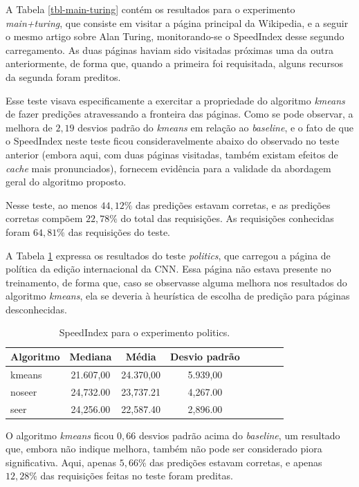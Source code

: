 \documentclass[10pt,twocolumn,letterpaper]{article}
\begin{document}
A Tabela \ref{tbl-main-turing} contém os resultados para o experimento \emph{main+turing}, que consiste em visitar a página principal da Wikipedia, e a seguir o mesmo artigo sobre Alan Turing, monitorando-se o SpeedIndex desse segundo carregamento. As duas páginas haviam sido visitadas próximas uma da outra anteriormente, de forma que, quando a primeira foi requisitada, alguns recursos da segunda foram preditos.

Esse teste visava especificamente a exercitar a propriedade do algoritmo \emph{kmeans} de fazer predições atravessando a fronteira das páginas. Como se pode observar,  a melhora de $2,19$ desvios padrão do \emph{kmeans} em relação ao \emph{baseline}, e o fato de que o SpeedIndex neste teste ficou consideravelmente abaixo do observado no teste anterior (embora aqui, com duas páginas visitadas, também existam efeitos de \emph{cache} mais pronunciados), fornecem evidência para a validade da abordagem geral do algoritmo proposto.

Nesse teste, ao menos $44,12 \%$ das predições estavam corretas, e as predições corretas compõem $22,78 \%$ do total das requisições. As requisições conhecidas foram $64,81 \%$ das requisições do teste.

A Tabela \ref{tbl-cnn-politics} expressa os resultados do teste \emph{politics}, que carregou a página de política da edição internacional da CNN. Essa página não estava presente no treinamento, de forma que, caso se observasse alguma melhora nos resultados do algoritmo \emph{kmeans}, ela se deveria à heurística de escolha de predição para páginas desconhecidas.

\begin{table}
\begin{center}
\begin{tabular}{l*{6}{c}r}
\hline
Algoritmo & Mediana & Média & Desvio padrão \\
\hline
kmeans & 21.607,00 & 24.370,00 & 5.939,00 \\
noseer  & 24,732.00 & 23,737.21  & 4,267.00 \\
seer & 24,256.00 & 22,587.40 & 2,896.00 \\
\hline
\end{tabular}
\end{center}
\caption{SpeedIndex para o experimento politics.}
\label{tbl-cnn-politics}
\end{table}

O algoritmo \emph{kmeans} ficou $0,66$ desvios padrão acima do \emph{baseline}, um resultado que, embora não indique melhora, também não pode ser considerado piora significativa. Aqui, apenas $5,66 \%$ das predições estavam corretas, e apenas $12,28 \%$ das requisições feitas no teste foram preditas.
\end{document}
